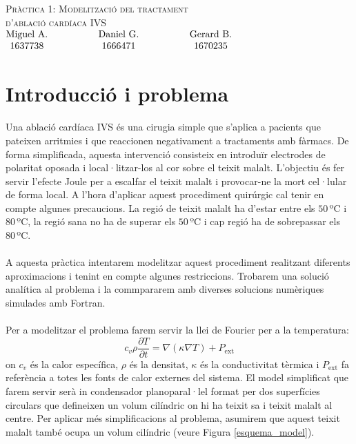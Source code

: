 \documentclass{article}
\begin{document}
\thispagestyle{empty}
\begin{center}
    {\LARGE \textsc{Pràctica 1: Modelització del tractament}}\\ 
    \vspace{0.2cm}
    {\LARGE \textsc{d'ablació cardíaca IVS}}\\ 
    \vspace{0.2cm}
    $\begin{matrix} 
    \text{Miguel A.} \hspace{1.5cm} & \text{Daniel G.} & \hspace{1.5cm} \text{Gerard B.}\\1637738 \hspace{1.5cm} & 1666471 & \hspace{1.5cm} 1670235
    \end{matrix}$

    
\end{center}
\section{Introducció i problema}
Una ablació cardíaca IVS és una cirugia simple que s'aplica a pacients que pateixen arritmies i que reaccionen negativament a tractaments amb fàrmacs. De forma simplificada, aquesta intervenció consisteix en introduïr electrodes de polaritat oposada i local·litzar-los al cor sobre el teixit malalt. L'objectiu és fer servir l'efecte Joule per a escalfar el teixit malalt i provocar-ne la mort cel·lular de forma local. A l'hora d'aplicar aquest procediment quirúrgic cal tenir en compte algunes precaucions. La regió de teixit malalt ha d'estar entre els \(50\,\text{ºC}\) i \(80\,\text{ºC}\), la regió sana no ha de superar els \(50\,\text{ºC}\) i cap regió ha de sobrepassar els \(80\,\text{ºC}\).\\\\
A aquesta pràctica intentarem modelitzar aquest procediment realitzant diferents aproximacions i tenint en compte algunes restriccions. Trobarem una solució analítica al problema i la commpararem amb diverses solucions numèriques simulades amb Fortran.\\\\
Per a modelitzar el problema farem servir la llei de Fourier per a la temperatura:
\begin{equation*}
    c_{v}\rho \frac{\partial T}{\partial t} = \nabla (\kappa \nabla T) + P_{\text{ext}}
\end{equation*}
on $c_{v}$ és la calor específica, $\rho$ és la densitat, $\kappa$ és la conductivitat tèrmica i $P_{\text{ext}}$ fa referència a totes les fonts de calor externes del sistema. El model simplificat que farem servir serà in condensador planoparal·lel format per dos superfícies circulars que defineixen un volum cilíndric on hi ha teixit sa i teixit malalt al centre. Per aplicar més simplificacions al problema, asumirem que aquest teixit malalt també ocupa un volum cilíndric (veure Figura \ref{esquema_model}). 
\end{document}
